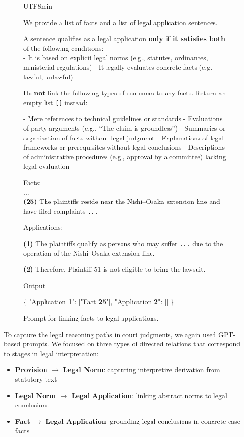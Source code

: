 \documentclass[11pt]{article}
\begin{document}
\begin{figure}[tb]
  \centering
  \begin{CJK}{UTF8}{min}
  \begin{tcolorbox}[enhanced, colback=white]
We provide a list of facts and a list of legal application sentences.

A sentence qualifies as a legal application \textbf{only if it satisfies both} of the following conditions:\\
- It is based on explicit legal norms (e.g., statutes, ordinances, ministerial regulations)  
- It legally evaluates concrete facts (e.g., lawful, unlawful)

Do \textbf{not} link the following types of sentences to any facts. Return an empty list \texttt{[]} instead:

- Mere references to technical guidelines or standards  
- Evaluations of party arguments (e.g., “The claim is groundless”)  
- Summaries or organization of facts without legal judgment  
- Explanations of legal frameworks or prerequisites without legal conclusions  
- Descriptions of administrative procedures (e.g., approval by a committee) lacking legal evaluation


Facts:\\
...\\
\textbf{(25)} The plaintiffs reside near the Nishi--Osaka extension line and have filed complaints \texttt{...}

Applications:

\textbf{(1)} The plaintiffs qualify as persons who may suffer \texttt{...} due to the operation of the Nishi--Osaka extension line.

\textbf{(2)} Therefore, Plaintiff 51 is not eligible to bring the lawsuit.

Output:

\{  
  "Application \textbf{1}": ["Fact \textbf{25}"],  
  "Application \textbf{2}": []  
\}
  \end{tcolorbox}
  \end{CJK}
  \caption{Prompt for linking facts to legal applications.}
  \label{fig:prompt-fact-application}
\end{figure}


To capture the legal reasoning paths in court judgments, we again used GPT-based prompts. We focused on three types of directed relations that correspond to stages in legal interpretation:

\begin{itemize}
  \item \textbf{Provision $\rightarrow$ Legal Norm}: capturing interpretive derivation from statutory text
  \item \textbf{Legal Norm $\rightarrow$ Legal Application}: linking abstract norms to legal conclusions
  \item \textbf{Fact $\rightarrow$ Legal Application}: grounding legal conclusions in concrete case facts
\end{itemize}
\end{document}

